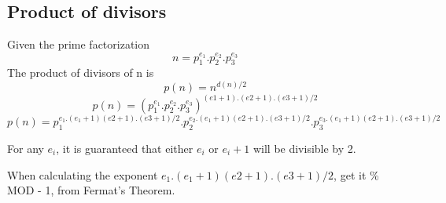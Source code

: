 \subsection{Product of divisors}
Given the prime factorization $$ n = p_1^{e_1} . p_2^{e_2} . p_3^{e_3} $$
The product of divisors of n is
$$ p(n) = n^{d(n) / 2} $$
$$ p(n) = (p_1^{e_1} . p_2^{e_2} . p_3^{e_3})^{(e1 + 1) . (e2 + 1) . (e3 + 1) / 2} $$
$$ p(n) = p_1^{e_1 . (e_1 + 1) (e2 + 1) . (e3 + 1) / 2} . p_2^{e_2 . (e_1 + 1) (e2 + 1) . (e3 + 1) / 2} . p_3^{e_3 . (e_1 + 1) (e2 + 1) . (e3 + 1) / 2} $$

For any $e_i$, it is guaranteed that either $e_i$ or $e_i + 1$ will be divisible by 2.

When calculating the exponent $e_1 . (e_1 + 1) (e2 + 1) . (e3 + 1) / 2$, get it \% MOD - 1, from Fermat's Theorem.
